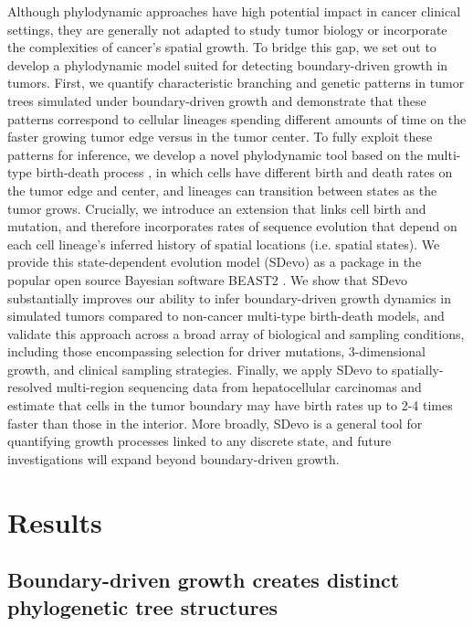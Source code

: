 \documentclass[12pt]{elife_based}
\begin{document}
Although phylodynamic approaches have high potential impact in cancer clinical settings, they are generally not adapted to study tumor biology or incorporate the complexities of cancer's spatial growth. To bridge this gap, we set out to develop a phylodynamic model suited for detecting boundary-driven growth in tumors. First, we quantify characteristic branching and genetic patterns in tumor trees simulated under boundary-driven growth and demonstrate that these patterns correspond to cellular lineages spending different amounts of time on the faster growing tumor edge versus in the tumor center.
To fully exploit these patterns for inference, we develop a novel phylodynamic tool based on the multi-type birth-death process \citep{Maddison2007a,stadler2013uncovering,Kuhnert:2016vv}, in which cells have different birth and death rates on the tumor edge and center, and lineages can transition between states as the tumor grows. Crucially, we introduce an extension that links cell birth and mutation, and therefore incorporates rates of sequence evolution that depend on each cell lineage's inferred history of spatial locations (i.e. spatial states). 
We provide this state-dependent evolution model (SDevo) as a package in the popular open source Bayesian software BEAST2 \citep{BouckaertBeast2}.
We show that SDevo substantially improves our ability to infer boundary-driven growth dynamics in simulated tumors compared to non-cancer multi-type birth-death models, and validate this approach across a broad array of biological and sampling conditions, including those encompassing selection for driver mutations, 3-dimensional growth, and clinical sampling strategies. Finally, we apply SDevo to spatially-resolved multi-region sequencing data from hepatocellular carcinomas \citep{Li2022} and estimate that cells in the tumor boundary may have birth rates up to 2-4 times faster than those in the interior. More broadly, SDevo is a general tool for quantifying growth processes linked to any discrete state, and future investigations will expand beyond boundary-driven growth. 

\section*{Results}


\subsection*{Boundary-driven growth creates distinct phylogenetic tree structures}
\end{document}
